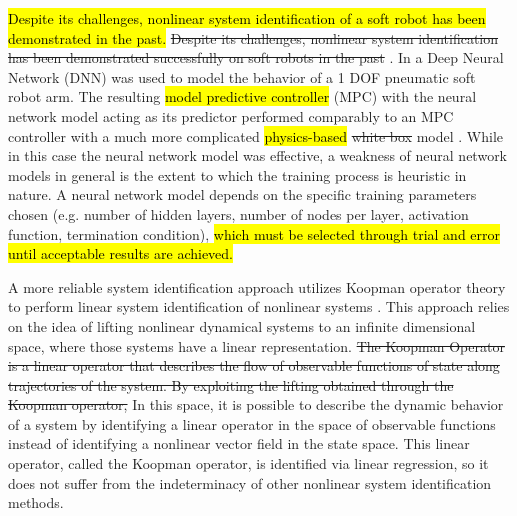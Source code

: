 \hl{Despite its challenges, nonlinear system identification of a soft robot has been demonstrated in the past.}
\sout{Despite its challenges, nonlinear system identification has been demonstrated successfully on soft robots in the past} .
In \cite{gillespie2018learning} a Deep Neural Network (DNN) was used to model the behavior of a 1 DOF pneumatic soft robot arm.
The resulting \hl{model predictive controller} (MPC)  with the neural network model acting as its predictor performed comparably to an MPC controller with a much more complicated \hl{physics-based} \sout{white box} model .
While in this case the neural network model was effective, a weakness of neural network models in general is the extent to which the training process is heuristic in nature.
A neural network model depends on the specific training parameters chosen (e.g. number of hidden layers, number of nodes per layer, activation function, termination condition), 
\hl{which must be selected through trial and error until acceptable results are achieved.}

A more reliable system identification approach utilizes Koopman operator theory to perform linear system identification of nonlinear systems .
This approach relies on the idea of lifting nonlinear dynamical systems to an infinite dimensional space, where those systems have a linear representation.
\sout{The Koopman Operator is a linear operator that describes the flow of observable functions of state along trajectories of the system.
By exploiting the lifting obtained through the Koopman operator,}
In this space, it is possible to describe the dynamic behavior of a system by identifying a linear operator in the space of observable functions instead of identifying a nonlinear vector field in the state space.
This linear operator, called the Koopman operator, is identified via linear regression, so it does not suffer from the indeterminacy of other nonlinear system identification methods.

